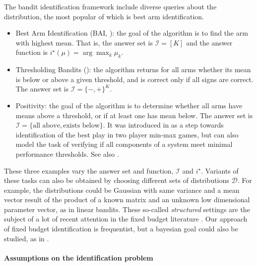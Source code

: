 \documentclass{article}
\begin{document}
The bandit identification framework include diverse queries about the distribution, the most popular of which is best arm identification.

\begin{itemize}
	\item Best Arm Identification (BAI, \cite{even2006action,bubeck2009pure,audibert2010best,gabillon2012best,karnin2013almost}): the goal of the algorithm is to find the arm with highest mean. That is, the answer set is $\mathcal I = [K]$ and the answer function is $i^\star(\mu) = \arg\max_k \mu_k$.

	\item Thresholding Bandits (\cite{locatelli2016optimal}): the algorithm returns for all arms whether its mean is below or above a given threshold, and is correct only if all signs are correct. The answer set is $\mathcal I = \{-, +\}^K$.
	
	\item Positivity: the goal of the algorithm is to determine whether all arms have means above a threshold, or if at least one has mean below. The answer set is $\mathcal I = \{\text{all above}, \text{exists below}\}$. It was introduced in \cite{kaufmann2018sequential} as a step towards identification of the best play in two player min-max games, but can also model the task of verifying if all components of a system meet minimal performance thresholds. See also \cite{degenne2019pure}.
\end{itemize}

These three examples vary the answer set and function, $\mathcal I$ and $i^\star$. Variants of these tasks can also be obtained by choosing different sets of distributions $\mathcal D$. For example, the distributions could be Gaussian with same variance and a mean vector result of the product of a known matrix and an unknown low dimensional parameter vector, as in linear bandits. These so-called \emph{structured} settings are the subject of a lot of recent attention in the fixed budget literature \cite{azizi2021fixed,alieva2021robust,yangminimax,cheshire2021problem}.
Our approach of fixed budget identification is frequentist, but a bayesian goal could also be studied, as in \cite{atsidakou2022bayesian}.


\paragraph{Assumptions on the identification problem}
\label{par:assumptions_on_the_identification_problem}
\end{document}
